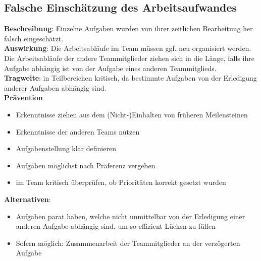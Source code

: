 \documentclass[a4paper, 12pt, titlepage]{scrartcl}
\begin{document}
	\subsection{Falsche Einsch\"atzung des Arbeitsaufwandes}
		\textbf{Beschreibung}: Einzelne Aufgaben wurden von ihrer zeitlichen Bearbeitung her falsch eingesch\"atzt.\\
		\textbf{Auswirkung}: Die Arbeitsabl\"aufe im Team m\"ussen ggf. neu organisiert werden. Die Arbeitsabl\"aufe der andere Teammitglieder ziehen sich in die L\"ange, falls ihre Aufgabe abh\"angig ist von der Aufgabe eines anderen Teammitglieds.\\
		\textbf{Tragweite}: in Teilbereichen kritisch, da bestimmte Aufgaben von der Erledigung anderer Aufgaben abh\"angig sind.\\
		\textbf{Pr\"avention}
			\begin{itemize}
				\item Erkenntnisse ziehen aus dem (Nicht-)Einhalten von fr\"uheren Meilensteinen
				\item Erkenntnisse der anderen Teams nutzen
				\item Aufgabenstellung klar definieren
				\item Aufgaben m\"oglichst nach Pr\"aferenz vergeben
				\item im Team kritisch \"uberpr\"ufen, ob Priorit\"aten korrekt gesetzt wurden
			\end{itemize}
		\textbf{Alternativen}: 
			\begin{itemize}
				\item Aufgaben parat haben, welche nicht unmittelbar von der Erledigung einer anderen Aufgabe abh\"angig sind, um so effizient L\"ucken zu f\"ullen
				\item Sofern m\"oglich: Zusammenarbeit der Teammitglieder an der verz\"ogerten Aufgabe
			\end{itemize}
		
\end{document}
